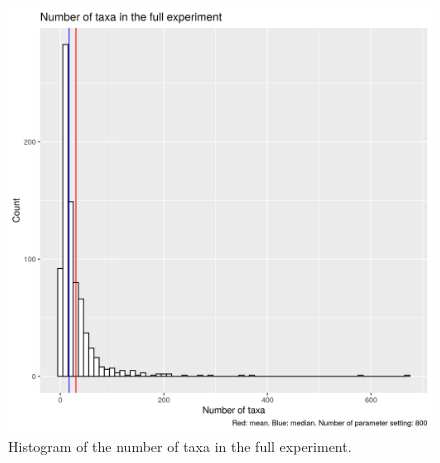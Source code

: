 \begin{figure}[!htbp]
  \includegraphics[width=\textwidth]{20200204_fig_n_taxa.png}
  \caption{
    Histogram of the number of taxa in the full experiment.
  }
  \label{fig:n_taxa}
\end{figure}


